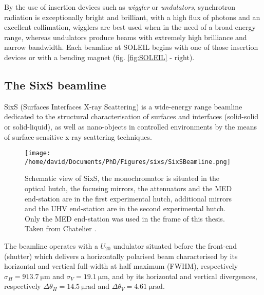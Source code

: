 By the use of insertion devices such as \textit{wiggler} or \textit{undulators}, synchrotron radiation is exceptionally bright and brilliant, with a high flux of photons and an excellent collimation, wigglers are best used when in the need of a broad energy range, whereas undulators produce beams with extremely high brilliance and narrow bandwidth.
Each beamline at SOLEIL begins with one of those insertion devices or with a bending magnet (fig. \ref{fig:SOLEIL} - right).

\subsection{The SixS beamline}

SixS (Surfaces Interfaces X-ray Scattering) is a wide-energy range beamline dedicated to the structural characterisation of surfaces and interfaces (solid-solid or solid-liquid), as well as nano-objects in controlled environments by the means of surface-sensitive x-ray scattering techniques.

\begin{figure}[!htb]
    \centering
    \texttt{[image: /home/david/Documents/PhD/Figures/sixs/SixSBeamline.png]}
    \caption{
		Schematic view of SixS, the monochromator is situated in the optical hutch, the focusing mirrors, the attenuators and the MED end-station are in the first experimental hutch, additional mirrors and the UHV end-station are in the second experimental hutch.
		Only the MED end-station was used in the frame of this thesis.
        Taken from Chatelier \parencite*{Chatelier2020}.
    }
    \label{fig:SixSBeamline}
\end{figure}

The beamline operates with a $U_{20}$ undulator situated before the front-end (shutter) which delivers a horizontally polarised beam characterised by its horizontal and vertical full-width at half maximum (FWHM), respectively $\sigma_H = \qty{913.7}{\um}$ and $\sigma_V = \qty{19.1}{\um}$, and by its horizontal and vertical divergences, respectively $\Delta\theta_H = \qty{14.5}{\micro\radian}$ and $\Delta\theta_V = \qty{4.61}{\micro\radian}$.


